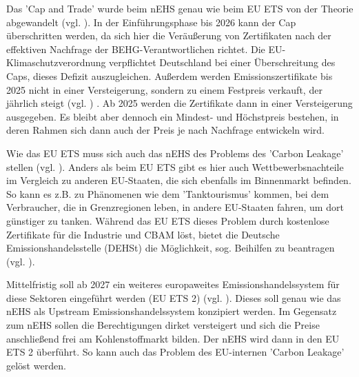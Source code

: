 Das 'Cap and Trade' wurde beim nEHS genau wie beim EU ETS von der Theorie abgewandelt (vgl. \cite{dehst.2023}).
In der Einführungsphase bis 2026 kann der Cap überschritten werden, da sich hier die Veräußerung von Zertifikaten nach der effektiven Nachfrage der BEHG-Verantwortlichen richtet.
Die EU-Klimaschutzverordnung verpflichtet Deutschland bei einer Überschreitung des Caps, dieses Defizit auszugleichen. 
Außerdem werden Emissionszertifikate bis 2025 nicht in einer Versteigerung, sondern zu einem Festpreis verkauft, der jährlich steigt (vgl. \cite{dehst.2023}) .
Ab 2025 werden die Zertifikate dann in einer Versteigerung ausgegeben.
Es bleibt aber dennoch ein Mindest- und Höchstpreis bestehen, in deren Rahmen sich dann auch der Preis je nach Nachfrage entwickeln wird.

Wie das EU ETS muss sich auch das nEHS des Problems des 'Carbon Leakage' stellen (vgl. \cite{dehst2.2023}). 
Anders als beim EU ETS gibt es hier auch Wettbewerbsnachteile im Vergleich zu anderen EU-Staaten, die sich ebenfalls im Binnenmarkt befinden.
So kann es z.B. zu Phänomenen wie dem 'Tanktourismus' kommen, bei dem Verbraucher, die in Grenzregionen leben, in andere EU-Staaten fahren, um dort günstiger zu tanken.
Während das EU ETS dieses Problem durch kostenlose Zertifikate für die Industrie und CBAM löst, bietet die Deutsche Emissionshandelsstelle (DEHSt) die Möglichkeit, sog. Beihilfen zu beantragen (vgl. \cite{dehst2.2023}).

Mittelfristig soll ab 2027 ein weiteres europaweites Emissionshandelssystem für diese Sektoren eingeführt werden (EU ETS 2) (vgl. \cite{ub.2023}).
Dieses soll genau wie das nEHS als Upstream Emissionshandelssystem konzipiert werden. Im Gegensatz zum nEHS sollen die Berechtigungen dirket versteigert und sich die Preise anschließend frei am Kohlenstoffmarkt bilden. 
Der nEHS wird dann in den EU ETS 2 überführt. So kann auch das Problem des EU-internen 'Carbon Leakage' gelöst werden.